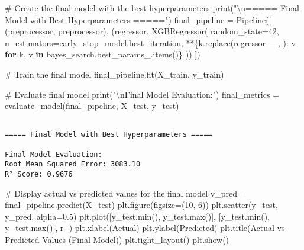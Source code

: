 \documentclass[
  letterpaper,
  DIV=11,
  numbers=noendperiod]{scrreprt}
\newenvironment{Shaded}{\begin{snugshade}}{\end{snugshade}}
\newcommand{\BuiltInTok}[1]{\textcolor[rgb]{0.00,0.23,0.31}{#1}}
\newcommand{\CharTok}[1]{\textcolor[rgb]{0.13,0.47,0.30}{#1}}
\newcommand{\CommentTok}[1]{\textcolor[rgb]{0.37,0.37,0.37}{#1}}
\newcommand{\ControlFlowTok}[1]{\textcolor[rgb]{0.00,0.23,0.31}{\textbf{#1}}}
\newcommand{\DecValTok}[1]{\textcolor[rgb]{0.68,0.00,0.00}{#1}}
\newcommand{\FloatTok}[1]{\textcolor[rgb]{0.68,0.00,0.00}{#1}}
\newcommand{\KeywordTok}[1]{\textcolor[rgb]{0.00,0.23,0.31}{\textbf{#1}}}
\newcommand{\NormalTok}[1]{\textcolor[rgb]{0.00,0.23,0.31}{#1}}
\newcommand{\OperatorTok}[1]{\textcolor[rgb]{0.37,0.37,0.37}{#1}}
\newcommand{\StringTok}[1]{\textcolor[rgb]{0.13,0.47,0.30}{#1}}
\begin{document}
\begin{Shaded}
\begin{Highlighting}[]
\CommentTok{\# Create the final model with the best hyperparameters}
\BuiltInTok{print}\NormalTok{(}\StringTok{"}\CharTok{\textbackslash{}n}\StringTok{===== Final Model with Best Hyperparameters ====="}\NormalTok{)}
\NormalTok{final\_pipeline }\OperatorTok{=}\NormalTok{ Pipeline([}
\NormalTok{    (}\StringTok{\textquotesingle{}preprocessor\textquotesingle{}}\NormalTok{, preprocessor),}
\NormalTok{    (}\StringTok{\textquotesingle{}regressor\textquotesingle{}}\NormalTok{, XGBRegressor(}
\NormalTok{        random\_state}\OperatorTok{=}\DecValTok{42}\NormalTok{,}
\NormalTok{        n\_estimators}\OperatorTok{=}\NormalTok{early\_stop\_model.best\_iteration,}
        \OperatorTok{**}\NormalTok{\{k.replace(}\StringTok{\textquotesingle{}regressor\_\_\textquotesingle{}}\NormalTok{, }\StringTok{\textquotesingle{}\textquotesingle{}}\NormalTok{): v }\ControlFlowTok{for}\NormalTok{ k, v }\KeywordTok{in}\NormalTok{ bayes\_search.best\_params\_.items()\}}
\NormalTok{    ))}
\NormalTok{])}

\CommentTok{\# Train the final model}
\NormalTok{final\_pipeline.fit(X\_train, y\_train)}

\CommentTok{\# Evaluate final model}
\BuiltInTok{print}\NormalTok{(}\StringTok{"}\CharTok{\textbackslash{}n}\StringTok{Final Model Evaluation:"}\NormalTok{)}
\NormalTok{final\_metrics }\OperatorTok{=}\NormalTok{ evaluate\_model(final\_pipeline, X\_test, y\_test)}
\end{Highlighting}
\end{Shaded}

\begin{verbatim}

===== Final Model with Best Hyperparameters =====

Final Model Evaluation:
Root Mean Squared Error: 3083.10
R² Score: 0.9676
\end{verbatim}

\begin{Shaded}
\begin{Highlighting}[]
\CommentTok{\# Display actual vs predicted values for the final model}
\NormalTok{y\_pred }\OperatorTok{=}\NormalTok{ final\_pipeline.predict(X\_test)}
\NormalTok{plt.figure(figsize}\OperatorTok{=}\NormalTok{(}\DecValTok{10}\NormalTok{, }\DecValTok{6}\NormalTok{))}
\NormalTok{plt.scatter(y\_test, y\_pred, alpha}\OperatorTok{=}\FloatTok{0.5}\NormalTok{)}
\NormalTok{plt.plot([y\_test.}\BuiltInTok{min}\NormalTok{(), y\_test.}\BuiltInTok{max}\NormalTok{()], [y\_test.}\BuiltInTok{min}\NormalTok{(), y\_test.}\BuiltInTok{max}\NormalTok{()], }\StringTok{\textquotesingle{}r{-}{-}\textquotesingle{}}\NormalTok{)}
\NormalTok{plt.xlabel(}\StringTok{\textquotesingle{}Actual\textquotesingle{}}\NormalTok{)}
\NormalTok{plt.ylabel(}\StringTok{\textquotesingle{}Predicted\textquotesingle{}}\NormalTok{)}
\NormalTok{plt.title(}\StringTok{\textquotesingle{}Actual vs Predicted Values (Final Model)\textquotesingle{}}\NormalTok{)}
\NormalTok{plt.tight\_layout()}
\NormalTok{plt.show()}
\end{Highlighting}
\end{Shaded}
\end{document}
